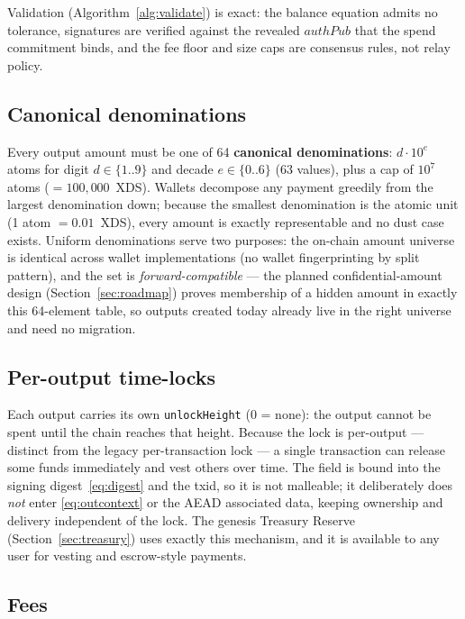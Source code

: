 \documentclass[11pt,a4paper]{article}
\newcommand{\code}[1]{\texttt{\small #1}}
\begin{document}
Validation (Algorithm~\ref{alg:validate}) is exact: the balance equation
admits no tolerance, signatures are verified against the revealed
$\mathit{authPub}$ that the spend commitment binds, and the fee floor and
size caps are consensus rules, not relay policy.

\subsection{Canonical denominations}\label{sec:denoms}

Every output amount must be one of 64 \textbf{canonical denominations}:
$d \cdot 10^{e}$ atoms for digit $d \in \{1..9\}$ and decade
$e \in \{0..6\}$ (63 values), plus a cap of $10^{7}$ atoms
($=100{,}000$~XDS). Wallets decompose any payment greedily from the largest
denomination down; because the smallest denomination is the atomic unit
(1 atom $= 0.01$~XDS), every amount is exactly representable and no dust case
exists. Uniform denominations serve two purposes: the on-chain amount universe
is identical across wallet implementations (no wallet fingerprinting by split
pattern), and the set is \emph{forward-compatible} --- the planned
confidential-amount design (Section~\ref{sec:roadmap}) proves membership of a
hidden amount in exactly this 64-element table, so outputs created today
already live in the right universe and need no migration.

\subsection{Per-output time-locks}\label{sec:timelocks}

Each output carries its own \code{unlockHeight} (0 = none): the output cannot
be spent until the chain reaches that height. Because the lock is per-output
--- distinct from the legacy per-transaction lock --- a single transaction can
release some funds immediately and vest others over time. The field is bound
into the signing digest~\eqref{eq:digest} and the txid, so it is not
malleable; it deliberately does \emph{not} enter \eqref{eq:outcontext} or the
AEAD associated data, keeping ownership and delivery independent of the lock.
The genesis Treasury Reserve (Section~\ref{sec:treasury}) uses exactly this
mechanism, and it is available to any user for vesting and escrow-style
payments.

\subsection{Fees}\label{sec:fees}
\end{document}
